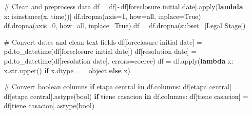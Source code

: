 \documentclass[
  letterpaper,
  DIV=11,
  numbers=noendperiod]{scrartcl}
\newenvironment{Shaded}{\begin{snugshade}}{\end{snugshade}}
\newcommand{\BuiltInTok}[1]{\textcolor[rgb]{0.00,0.23,0.31}{#1}}
\newcommand{\CommentTok}[1]{\textcolor[rgb]{0.37,0.37,0.37}{#1}}
\newcommand{\ControlFlowTok}[1]{\textcolor[rgb]{0.00,0.23,0.31}{\textbf{#1}}}
\newcommand{\DecValTok}[1]{\textcolor[rgb]{0.68,0.00,0.00}{#1}}
\newcommand{\KeywordTok}[1]{\textcolor[rgb]{0.00,0.23,0.31}{\textbf{#1}}}
\newcommand{\NormalTok}[1]{\textcolor[rgb]{0.00,0.23,0.31}{#1}}
\newcommand{\OperatorTok}[1]{\textcolor[rgb]{0.37,0.37,0.37}{#1}}
\newcommand{\StringTok}[1]{\textcolor[rgb]{0.13,0.47,0.30}{#1}}
\newcommand{\VariableTok}[1]{\textcolor[rgb]{0.07,0.07,0.07}{#1}}
\begin{document}
\begin{Shaded}
\begin{Highlighting}[]
\CommentTok{\# Clean and preprocess data}
\NormalTok{df }\OperatorTok{=}\NormalTok{ df[}\OperatorTok{\textasciitilde{}}\NormalTok{df[}\StringTok{\textquotesingle{}foreclosure initial date\textquotesingle{}}\NormalTok{].}\BuiltInTok{apply}\NormalTok{(}\KeywordTok{lambda}\NormalTok{ x: }\BuiltInTok{isinstance}\NormalTok{(x, time))]}
\NormalTok{df.dropna(axis}\OperatorTok{=}\DecValTok{1}\NormalTok{, how}\OperatorTok{=}\StringTok{\textquotesingle{}all\textquotesingle{}}\NormalTok{, inplace}\OperatorTok{=}\VariableTok{True}\NormalTok{)}
\NormalTok{df.dropna(axis}\OperatorTok{=}\DecValTok{0}\NormalTok{, how}\OperatorTok{=}\StringTok{\textquotesingle{}all\textquotesingle{}}\NormalTok{, inplace}\OperatorTok{=}\VariableTok{True}\NormalTok{)}
\NormalTok{df }\OperatorTok{=}\NormalTok{ df.dropna(subset}\OperatorTok{=}\NormalTok{[}\StringTok{\textquotesingle{}Legal Stage\textquotesingle{}}\NormalTok{])}

\CommentTok{\# Convert dates and clean text fields}
\NormalTok{df[}\StringTok{\textquotesingle{}foreclosure initial date\textquotesingle{}}\NormalTok{] }\OperatorTok{=}\NormalTok{ pd.to\_datetime(df[}\StringTok{\textquotesingle{}foreclosure initial date\textquotesingle{}}\NormalTok{])}
\NormalTok{df[}\StringTok{\textquotesingle{}resolution date\textquotesingle{}}\NormalTok{] }\OperatorTok{=}\NormalTok{ pd.to\_datetime(df[}\StringTok{\textquotesingle{}resolution date\textquotesingle{}}\NormalTok{], errors}\OperatorTok{=}\StringTok{\textquotesingle{}coerce\textquotesingle{}}\NormalTok{)}
\NormalTok{df }\OperatorTok{=}\NormalTok{ df.}\BuiltInTok{apply}\NormalTok{(}\KeywordTok{lambda}\NormalTok{ x: x.}\BuiltInTok{str}\NormalTok{.upper() }\ControlFlowTok{if}\NormalTok{ x.dtype }\OperatorTok{==} \StringTok{\textquotesingle{}object\textquotesingle{}} \ControlFlowTok{else}\NormalTok{ x)}

\CommentTok{\# Convert boolean columns}
\ControlFlowTok{if} \StringTok{\textquotesingle{}etapa central\textquotesingle{}} \KeywordTok{in}\NormalTok{ df.columns:}
\NormalTok{    df[}\StringTok{\textquotesingle{}etapa central\textquotesingle{}}\NormalTok{] }\OperatorTok{=}\NormalTok{ df[}\StringTok{\textquotesingle{}etapa central\textquotesingle{}}\NormalTok{].astype(}\StringTok{\textquotesingle{}bool\textquotesingle{}}\NormalTok{)}
\ControlFlowTok{if} \StringTok{\textquotesingle{}tiene casacion\textquotesingle{}} \KeywordTok{in}\NormalTok{ df.columns:}
\NormalTok{    df[}\StringTok{\textquotesingle{}tiene casacion\textquotesingle{}}\NormalTok{] }\OperatorTok{=}\NormalTok{ df[}\StringTok{\textquotesingle{}tiene casacion\textquotesingle{}}\NormalTok{].astype(}\StringTok{\textquotesingle{}bool\textquotesingle{}}\NormalTok{)}
\end{Highlighting}
\end{Shaded}
\end{document}
